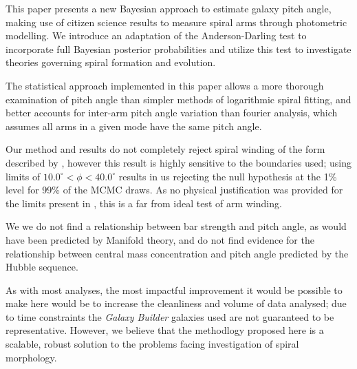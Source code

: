 This paper presents a new Bayesian approach to estimate galaxy pitch angle, making use of citizen science results to measure spiral arms through photometric modelling. We introduce an adaptation of the Anderson-Darling test to incorporate full Bayesian posterior probabilities and utilize this test to investigate theories governing spiral formation and evolution.

The statistical approach implemented in this paper allows a more thorough examination of pitch angle than simpler methods of logarithmic spiral fitting, and better accounts for inter-arm pitch angle variation than fourier analysis, which assumes all arms in a given mode have the same pitch angle.

Our method and results do not completely reject spiral winding of the form described by \citet{2019arXiv190910291P}, however this result is highly sensitive to the boundaries used; using limits of $10.0^\circ < \phi < 40.0^\circ$ results in us rejecting the null hypothesis at the 1\% level for 99\% of the MCMC draws. As no physical justification was provided for the limits present in \citet{2019arXiv190910291P}, this is a far from ideal test of arm winding.

We we do not find a relationship between bar strength and pitch angle, as would have been predicted by Manifold theory, and do not find evidence for the relationship between central mass concentration and pitch angle predicted by the Hubble sequence.

As with most analyses, the most impactful improvement it would be possible to make here would be to increase the cleanliness and volume of data analysed; due to time constraints the \textit{Galaxy Builder} galaxies used are not guaranteed to be representative. However, we believe that the methodlogy proposed here is a scalable, robust solution to the problems facing investigation of spiral morphology.
